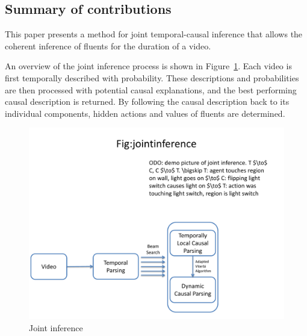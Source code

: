 \documentclass[10pt,journal,letterpaper,compsoc]{IEEEtran}
\begin{document}



\subsection{Summary of contributions}

This paper presents a method for joint temporal-causal inference that allows the coherent inference of fluents for the duration of a video.  

An overview of the joint inference process is shown in Figure~\ref{fig:jointinference}.  Each video is first temporally described with probability.  These descriptions and probabilities are then processed with potential causal explanations, and the best performing causal description is returned.  By following the causal description back to its individual components, hidden actions and values of fluents are determined.  %

\begin{figure}[hbtp]
\centering
\includegraphics[trim = 0in 0.25in 2.5in 3.5in, clip, width=0.9\linewidth]{jointinference.pdf}
\caption{Joint inference \label{fig:jointinference}}
\end{figure}
\end{document}
